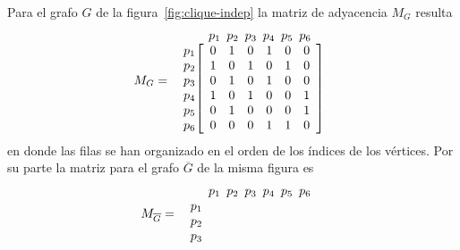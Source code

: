 \begin{ejemplo}
Para el grafo $G$ de la figura~\ref{fig:clique-indep} la matriz de adyacencia $M_G$ resulta
\[
M_G=
\begin{array}{cc}
& \hspace*{-1.5em}
\begin{array}{ccccccccccc}
p_1\hspace*{-0.5em}& p_2\hspace*{-0.5em} & p_3\hspace*{-0.5em} & p_4\hspace*{-0.5em} & p_5\hspace*{-0.5em} & p_6
\end{array}\\
\begin{array}{c}
p_1\\
p_2\\
p_3\\
p_4\\
p_5\\
p_6
\end{array}
& \hspace*{-1.5em}
\left[
\begin{array}{ccccccccc}
0&1&0&1&0&0 \\
1&0&1&0&1&0 \\
0&1&0&1&0&0 \\
1&0&1&0&0&1 \\
0&1&0&0&0&1 \\
0&0&0&1&1&0 \\
\end{array}
\right]
\end{array}
\]
en donde las filas se han organizado en el orden de los índices de los vértices.
Por su parte la matriz para el grafo $\overline G$ de la misma figura es
\[
M_{\overline G}=
\begin{array}{cc}
& \hspace*{-1.5em}
\begin{array}{ccccccccccc}
p_1\hspace*{-0.5em}& p_2\hspace*{-0.5em} & p_3\hspace*{-0.5em} & p_4\hspace*{-0.5em} & p_5\hspace*{-0.5em} & p_6
\end{array}\\
\begin{array}{c}
p_1\\
p_2\\
p_3\\

\end{array}
\end{array}\]
\end{ejemplo}
